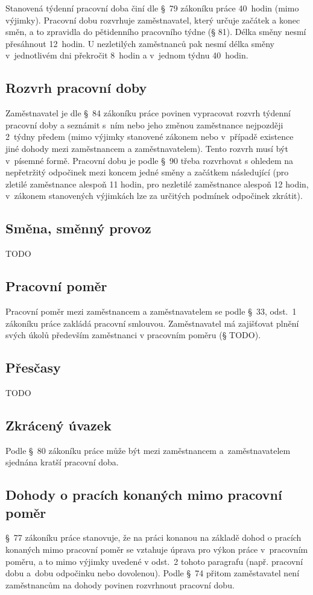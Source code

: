 \documentclass[twoside]{ctuthesis}
\begin{document}
Stanovená týdenní pracovní doba činí dle §~79 zákoníku práce 40~hodin (mimo výjimky). Pracovní dobu rozvrhuje zaměstnavatel, který určuje začátek a konec směn, a to zpravidla do pětidenního pracovního týdne (§ 81). Délka směny nesmí přesáhnout 12~hodin. U nezletilých zaměstnanců pak nesmí délka směny v~jednotlivém dni překročit 8~hodin a v~jednom týdnu 40~hodin.

\subsection{Rozvrh pracovní doby}
Zaměstnavatel je dle §~84 zákoníku práce povinen vypracovat rozvrh týdenní pracovní doby a seznámit s~ním nebo jeho změnou zaměstnance nejpozději 2~týdny předem (mimo výjimky stanovené zákonem nebo v~případě existence jiné dohody mezi zaměstnancem a zaměstnavatelem). Tento rozvrh musí být v~písemné formě. Pracovní dobu je podle §~90 třeba rozvrhovat s ohledem na nepřetržitý odpočinek mezi koncem jedné směny a začátkem následující (pro zletilé zaměstnance alespoň 11 hodin, pro nezletilé zaměstnance alespoň 12 hodin, v~zákonem stanovených výjimkách lze za určitých podmínek odpočinek zkrátit).

\subsection{Směna, směnný provoz}
TODO

\subsection{Pracovní poměr}
Pracovní poměr mezi zaměstnancem a zaměstnavatelem se podle §~33, odst.~1 zákoníku práce zakládá pracovní smlouvou. Zaměstnavatel má zajišťovat plnění svých úkolů především zaměstnanci v pracovním poměru (§ TODO).

\subsection{Přesčasy}
TODO

\subsection{Zkrácený úvazek}
Podle §~80 zákoníku práce může být mezi zaměstnancem a~zaměstnavatelem sjednána kratší pracovní doba.

\subsection{Dohody o pracích konaných mimo pracovní poměr}
§~77 zákoníku práce stanovuje, že na práci konanou na základě dohod o pracích konaných mimo pracovní poměr se vztahuje úprava pro výkon práce v~pracovním poměru, a to mimo výjimky uvedené v odst.~2 tohoto paragrafu (např. pracovní dobu a~dobu odpočinku nebo dovolenou). Podle §~74 přitom zaměstavatel není zaměstnancům na dohody povinen rozvrhnout pracovní dobu.
\end{document}
